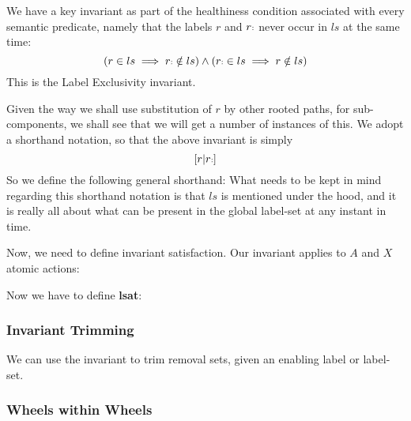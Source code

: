 We have a key invariant as part of the healthiness
condition associated with every semantic predicate,
namely that the labels $r$ and $r{\scriptstyle{:}}$ never occur in  $ls$ at
the same time:
\[
 ( r \in ls \implies r{\scriptstyle{:}} \notin ls )
 \land
 ( r{\scriptstyle{:}} \in ls \implies r \notin ls )
\]
This is the Label Exclusivity invariant.

Given the way we shall use substitution of $r$ by
other rooted paths, for sub-components,
we shall see that we will get a number of instances of this.
We adopt a shorthand notation,
so that the above invariant is simply
\[
  [r|r{\scriptstyle{:}}]
\]
So we define the following general shorthand:
What needs to be kept in mind regarding this shorthand notation
is that $ls$ is mentioned under the hood,
and it is really all about what can be present in the global label-set
at any instant in time.


Now, we need to define invariant satisfaction.
Our invariant applies to $A$ and $X$ atomic actions:

Now we have to define \textbf{lsat}:

\subsubsection{Invariant Trimming}

We can use the invariant to trim removal sets,
given an enabling label or label-set.

\subsubsection{Wheels within Wheels}\label{hc:WwW}

